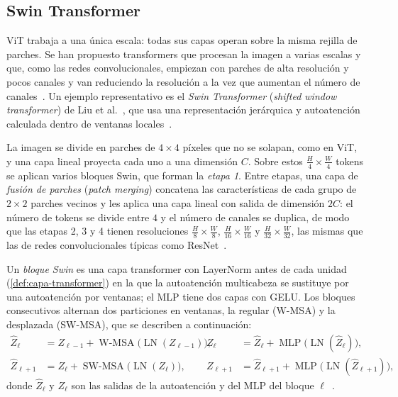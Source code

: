 \subsection{Swin Transformer}\label{sec:swin}

ViT trabaja a una única escala: todas sus capas operan sobre la misma rejilla de
parches. Se han propuesto transformers que procesan la imagen a varias escalas y
que, como las redes convolucionales, empiezan con parches de alta resolución y
pocos canales y van reduciendo la resolución a la vez que aumentan el número de
canales~\cite[sec.~12.10.3]{prince2023understanding}. Un ejemplo representativo
es el \emph{Swin Transformer} (\emph{shifted window transformer}) de Liu et
al.~\cite{liu2021swin}, que usa una representación jerárquica y autoatención
calculada dentro de ventanas locales~\cite[sec.~1]{liu2021swin}.

La imagen se divide en parches de $4\times4$ píxeles que no se solapan, como en
ViT, y una capa lineal proyecta cada uno a una dimensión $C$. Sobre estos
$\frac{H}{4}\times\frac{W}{4}$ tokens se aplican varios bloques Swin, que forman la
\emph{etapa 1}. Entre etapas, una capa de \emph{fusión de parches}
(\emph{patch merging}) concatena las características de cada grupo de $2\times2$
parches vecinos y les aplica una capa lineal con salida de dimensión $2C$: el
número de tokens se divide entre $4$ y el número de canales se duplica, de modo
que las etapas 2, 3 y 4 tienen resoluciones $\frac{H}{8}\times\frac{W}{8}$,
$\frac{H}{16}\times\frac{W}{16}$ y $\frac{H}{32}\times\frac{W}{32}$, las mismas que
las de redes convolucionales típicas como ResNet~\cite[sec.~3.1]{liu2021swin}.

Un \emph{bloque Swin} es una capa transformer con LayerNorm antes de cada unidad
(\cref{def:capa-transformer}) en la que la autoatención multicabeza se sustituye por una
autoatención por ventanas; el MLP tiene dos capas con GELU. Los bloques
consecutivos alternan dos particiones en ventanas, la regular (W-MSA) y la
desplazada (SW-MSA), que se describen a continuación:
\begin{align*}
  \widehat{Z}_\ell &= Z_{\ell-1} + \operatorname{W-MSA}\bigl(\operatorname{LN}(Z_{\ell-1})\bigr), &
  Z_\ell &= \widehat{Z}_\ell + \operatorname{MLP}\bigl(\operatorname{LN}(\widehat{Z}_\ell)\bigr),\\
  \widehat{Z}_{\ell+1} &= Z_\ell + \operatorname{SW-MSA}\bigl(\operatorname{LN}(Z_\ell)\bigr), &
  Z_{\ell+1} &= \widehat{Z}_{\ell+1} + \operatorname{MLP}\bigl(\operatorname{LN}(\widehat{Z}_{\ell+1})\bigr),
\end{align*}
donde $\widehat{Z}_\ell$ y $Z_\ell$ son las salidas de la autoatención y del MLP
del bloque $\ell$~\cite[ec.~(3)]{liu2021swin}.

